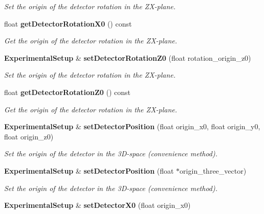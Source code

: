 \begin{DoxyCompactItemize}
\begin{DoxyCompactList}\small\item\em Set the origin of the detector rotation in the Z\-X-\/plane. \end{DoxyCompactList}\item 
float {\bf get\-Detector\-Rotation\-X0} () const \label{classCALICE_1_1ExperimentalSetup_a2ff6df503043d3ef5099ea5d6783e8f2}

\begin{DoxyCompactList}\small\item\em Get the origin of the detector rotation in the Z\-X-\/plane. \end{DoxyCompactList}\item 
{\bf Experimental\-Setup} \& {\bf set\-Detector\-Rotation\-Z0} (float rotation\-\_\-origin\-\_\-z0)\label{classCALICE_1_1ExperimentalSetup_ab540bcf4caac6b150e0ba91bb84ab432}

\begin{DoxyCompactList}\small\item\em Set the origin of the detector rotation in the Z\-X-\/plane. \end{DoxyCompactList}\item 
float {\bf get\-Detector\-Rotation\-Z0} () const \label{classCALICE_1_1ExperimentalSetup_aa8dbf060db859678b27585ceac86ffe5}

\begin{DoxyCompactList}\small\item\em Get the origin of the detector rotation in the Z\-X-\/plane. \end{DoxyCompactList}\item 
{\bf Experimental\-Setup} \& {\bf set\-Detector\-Position} (float origin\-\_\-x0, float origin\-\_\-y0, float origin\-\_\-z0)\label{classCALICE_1_1ExperimentalSetup_aaf75664b180814002f19098ec51b3d1d}

\begin{DoxyCompactList}\small\item\em Set the origin of the detector in the 3\-D-\/space (convenience method). \end{DoxyCompactList}\item 
{\bf Experimental\-Setup} \& {\bf set\-Detector\-Position} (float $\ast$origin\-\_\-three\-\_\-vector)\label{classCALICE_1_1ExperimentalSetup_aab3af41304b7791a7c2a89f8176f2727}

\begin{DoxyCompactList}\small\item\em Set the origin of the detector in the 3\-D-\/space (convenience method). \end{DoxyCompactList}\item 
{\bf Experimental\-Setup} \& {\bf set\-Detector\-X0} (float origin\-\_\-x0)\label{classCALICE_1_1ExperimentalSetup_aaa5c739bf5550616dc9daf06e66fa7d3}


\end{DoxyCompactItemize}
